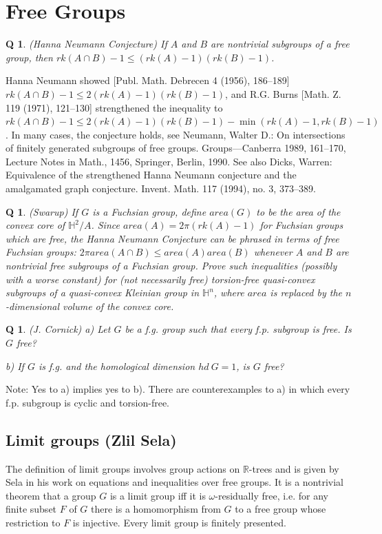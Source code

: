 \documentclass[11pt]{article}
\newtheorem{q}[thm]{Q}
\theoremstyle{remark}
\def\b{\begin{q}}
\def\e{\end{q}}
\def\R{{\mathbb R}}
\def\H{{\mathbb H}}
\newcommand{\<}{\langle}
\renewcommand{\>}{\rangle}
\begin{document}
\section{Free Groups}

\b
(Hanna Neumann Conjecture) If $A$ and $B$ are nontrivial subgroups
of a free group, then $rk(A\cap B)-1\leq (rk(A)-1)(rk(B)-1)$. \e
Hanna
Neumann showed [Publ. Math. Debrecen 4 (1956), 186--189] $rk(A\cap
B)-1\leq 2(rk(A)-1)(rk(B)-1)$, and R.G. Burns [Math. Z. 119 (1971),
121--130] strengthened the inequality to $rk(A\cap B)-1\leq
2(rk(A)-1)(rk(B)-1)- \min(rk(A)-1,rk(B)-1)$. In many cases, the
conjecture holds, see Neumann, Walter D.: On intersections of finitely
generated subgroups of free groups. Groups---Canberra 1989, 161--170,
Lecture Notes in Math., 1456, Springer, Berlin, 1990. See also Dicks,
Warren: Equivalence of the strengthened Hanna Neumann conjecture and
the amalgamated graph conjecture. Invent. Math. 117 (1994), no. 3,
373--389.

\b
(Swarup) If $G$ is a Fuchsian group, define $area(G)$ to be the
area of the convex core of $\H^2/A$. Since $area(A)=2\pi
(rk(A)-1)$ for Fuchsian groups which are free, the Hanna Neumann
Conjecture can be phrased in terms of free Fuchsian groups: $2\pi
area(A\cap B)\leq area(A)area(B)$ whenever $A$ and $B$ are nontrivial
free subgroups
of a Fuchsian group. Prove such inequalities (possibly with a worse
constant) for (not necessarily free) torsion-free quasi-convex
subgroups of a quasi-convex Kleinian group in $\H^n$, where $area$
is replaced by the $n$-dimensional volume of the convex core. \e




\b
(J. Cornick) a) Let $G$ be a f.g. group such that every f.p. subgroup
is free. Is $G$ free?

b) If $G$ is f.g. and the homological dimension $hd\ G=1$, is $G$ free?
\e

Note: Yes to a) implies yes to b). There are counterexamples to a) in
which every f.p. subgroup is cyclic and torsion-free.



\subsection{Limit groups (Zlil Sela)}
The definition of limit groups involves group actions on $\R$-trees and is
given by Sela in his work on equations and inequalities over free groups. It
is a nontrivial theorem that a group $G$ is a limit group iff it is
$\omega$-residually free, i.e. for any finite subset $F$ of $G$ there is a
homomorphism from $G$ to a free group whose restriction to $F$ is
injective. Every limit group is finitely presented.
\end{document}
